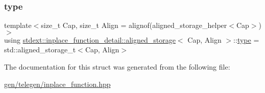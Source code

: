 \mbox{\label{structstdext_1_1inplace__function__detail_1_1aligned__storage_a2715429b3ff736ab58dea08f28f06947}} 
\subsubsection{\texorpdfstring{type}{type}\hspace{0.1cm}{\footnotesize\ttfamily [2/2]}}
{\footnotesize\ttfamily template$<$size\+\_\+t Cap, size\+\_\+t Align = alignof(aligned\+\_\+storage\+\_\+helper$<$\+Cap$>$)$>$ \\
using \hyperlink{structstdext_1_1inplace__function__detail_1_1aligned__storage}{stdext\+::inplace\+\_\+function\+\_\+detail\+::aligned\+\_\+storage}$<$ Cap, Align $>$\+::\hyperlink{structstdext_1_1inplace__function__detail_1_1aligned__storage_a2715429b3ff736ab58dea08f28f06947}{type} =  std\+::aligned\+\_\+storage\+\_\+t$<$Cap, Align$>$}



The documentation for this struct was generated from the following file\+:\begin{DoxyCompactItemize}
\item 
\hyperlink{gen_2telegen_2inplace__function_8hpp}{gen/telegen/inplace\+\_\+function.\+hpp}\end{DoxyCompactItemize}
